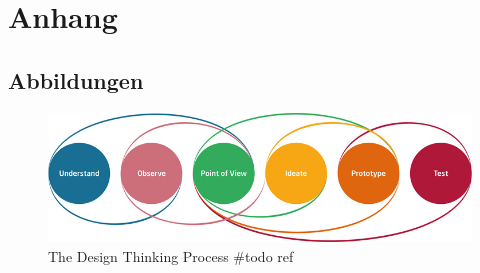 \appendix %

    \renewcommand{\thetable}{\Alph{table}}
    \setcounter{table}{0}
    \renewcommand{\thefigure}{\Alph{figure}}
    \setcounter{figure}{0}

\section{Anhang}
\subsection{Abbildungen}

\begin{figure}[h]
    \includegraphics[width=\textwidth]{img/DT_process.png}
    \caption{The Design Thinking Process \#todo ref}
    \label{fig:dt_process}
\end{figure} 


